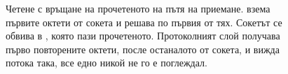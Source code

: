 \begin{figure}[htbp]
\begin{tikzpicture}
\end{tikzpicture}
\caption{Четене с връщане на прочетеното на пътя на приемане.
 взема първите октети от сокета и  решава по
първия от тях. Сокетът се обвива в , която пази
прочетеното. Протоколният слой получава първо повторените октети, после
останалото от сокета, и вижда потока така, все едно никой не го е поглеждал.}
\label{fig:pushback_connection}
\end{figure}
